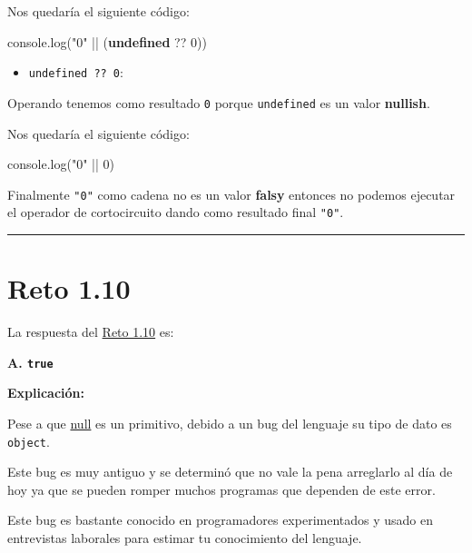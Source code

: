 \documentclass[
  letterpaper,
  DIV=11,
  numbers=noendperiod]{scrreprt}
\newenvironment{Shaded}{\begin{snugshade}}{\end{snugshade}}
\newcommand{\BuiltInTok}[1]{\textcolor[rgb]{0.00,0.23,0.31}{#1}}
\newcommand{\DecValTok}[1]{\textcolor[rgb]{0.68,0.00,0.00}{#1}}
\newcommand{\FunctionTok}[1]{\textcolor[rgb]{0.28,0.35,0.67}{#1}}
\newcommand{\KeywordTok}[1]{\textcolor[rgb]{0.00,0.23,0.31}{\textbf{#1}}}
\newcommand{\NormalTok}[1]{\textcolor[rgb]{0.00,0.23,0.31}{#1}}
\newcommand{\OperatorTok}[1]{\textcolor[rgb]{0.37,0.37,0.37}{#1}}
\newcommand{\StringTok}[1]{\textcolor[rgb]{0.13,0.47,0.30}{#1}}
\providecommand{\tightlist}{%
  \setlength{\itemsep}{0pt}\setlength{\parskip}{0pt}}
\begin{document}
Nos quedaría el siguiente código:

\begin{Shaded}
\begin{Highlighting}[]
\BuiltInTok{console}\OperatorTok{.}\FunctionTok{log}\NormalTok{(}\StringTok{"0"} \OperatorTok{||}\NormalTok{ (}\KeywordTok{undefined} \OperatorTok{??} \DecValTok{0}\NormalTok{))}
\end{Highlighting}
\end{Shaded}

\begin{itemize}
\tightlist
\item
  \texttt{undefined\ ??\ 0}:
\end{itemize}

Operando tenemos como resultado \texttt{0} porque \texttt{undefined} es
un valor \textbf{nullish}.

Nos quedaría el siguiente código:

\begin{Shaded}
\begin{Highlighting}[]
\BuiltInTok{console}\OperatorTok{.}\FunctionTok{log}\NormalTok{(}\StringTok{"0"} \OperatorTok{||} \DecValTok{0}\NormalTok{)}
\end{Highlighting}
\end{Shaded}

Finalmente \texttt{"0"} como cadena no es un valor \textbf{falsy}
entonces no podemos ejecutar el operador de cortocircuito dando como
resultado final \texttt{"0"}.

\begin{center}\rule{0.5\linewidth}{0.5pt}\end{center}

\section{Reto 1.10}\label{sec-sol-cap1-reto10}

La respuesta del \hyperref[sec-cap1-reto10]{Reto 1.10} es:

\textbf{A. \texttt{true}}

\textbf{Explicación:}

Pese a que \hyperref[glos-null]{null} es un primitivo, debido a un bug
del lenguaje su tipo de dato es \texttt{object}.

Este bug es muy antiguo y se determinó que no vale la pena arreglarlo al
día de hoy ya que se pueden romper muchos programas que dependen de este
error.

Este bug es bastante conocido en programadores experimentados y usado en
entrevistas laborales para estimar tu conocimiento del lenguaje.
\end{document}
